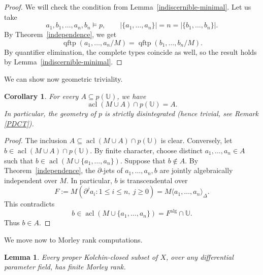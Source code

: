 \documentclass[11pt,a4paper]{amsart}
\newtheorem{lemma}[theorem]{Lemma}
\newtheorem{corollary}[theorem]{Corollary}
\theoremstyle{definition}
\newcommand{\acl}{\operatorname{acl}}
\newcommand{\Ucal}{{\mathds{U}}}
\begin{document}
\begin{proof}
We will check the condition from Lemma~\ref{indiscernible-minimal}. Let us take
\[
a_1,b_1,\ldots,a_n,b_n\models p,\qquad |\{a_1,\ldots,a_n\}|=n=|\{b_1,\ldots,b_n\}|.
\]
By Theorem~\ref{independence}, we get
\[
\operatorname{qftp}(a_1,\ldots,a_n/M)=\operatorname{qftp}(b_1,\ldots,b_n/M).
\]
By quantifier elimination, the complete types coincide as well, so the result holds by Lemma~\ref{indiscernible-minimal}.
\end{proof}
We can show now geometric triviality.
\begin{corollary}\label{triviality}
For every $A\subseteq p(\Ucal)$, we have
\[
 \acl(M\cup A)\cap p(\Ucal)=A.
\]
In particular, the geometry of $p$ is strictly disintegrated (hence trivial, see Remark \ref{PDCT}).
\end{corollary}
\begin{proof}
The inclusion $A\subseteq\acl(M\cup A)\cap p(\Ucal)$ is clear.
Conversely, let $b\in\acl(M\cup A)\cap p(\Ucal)$.
By finite character, choose distinct $a_1,\ldots,a_n\in A$
such that $b\in\acl(M\cup \{a_1,\ldots, a_n\})$.
Suppose that $b\notin A$. By Theorem~\ref{independence},
the $\partial$-jets of $a_1,\ldots,a_n,b$ are jointly
algebraically independent over $M$. In particular, $b$
is transcendental over
\[
F:=M(\partial^j a_i:1\leqslant i\leqslant n,\ j\geqslant0)
  =M\langle a_1,\ldots,a_n\rangle_\Delta.
\]
This contradicts
\[
b\in\acl(M\cup \{a_1,\ldots, a_n\})=F^{\mathrm{alg}}\cap\Ucal.
\]
Thus $b\in A$.
\end{proof}

We move now to Morley rank computations.
\begin{lemma}\label{proper-finite}
Every proper Kolchin-closed subset of $X$, over any differential
parameter field, has finite Morley rank.
\end{lemma}
\end{document}
